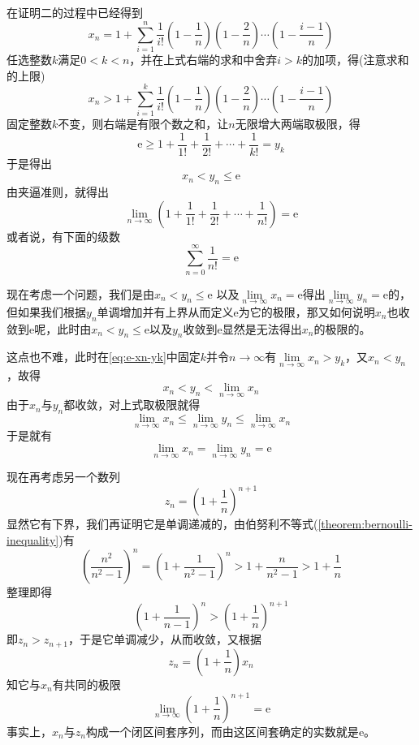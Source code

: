 在证明二的过程中已经得到
\[ x_n = 1 + \sum_{i=1}^n \frac{1}{i!}\left( 1-\frac{1}{n} \right) \left( 1-\frac{2}{n} \right) \cdots \left( 1-\frac{i-1}{n} \right) \]
任选整数$k$满足$0<k<n$，并在上式右端的求和中舍弃$i>k$的加项，得(注意求和的上限)
\begin{equation}\label{eq:e-xn-yk}
 x_n > 1 + \sum_{i=1}^k \frac{1}{i!}\left( 1-\frac{1}{n} \right) \left( 1-\frac{2}{n} \right) \cdots \left( 1-\frac{i-1}{n} \right) 
\end{equation}
固定整数$k$不变，则右端是有限个数之和，让$n$无限增大两端取极限，得
\[ \mathrm{e} \geqslant 1 + \frac{1}{1!} + \frac{1}{2!} + \cdots + \frac{1}{k!} = y_k \]
于是得出
\[ x_n < y_n \leqslant \mathrm{e} \]
由夹逼准则，就得出
\[ \lim_{n \to \infty} \left( 1 + \frac{1}{1!} + \frac{1}{2!} + \cdots + \frac{1}{n!} \right) = \mathrm{e} \]
或者说，有下面的级数
\begin{equation}
  \label{eq:series-1-devide-by-n-fractor-is-e}
 \sum_{n=0}^{\infty} \frac{1}{n!} = \mathrm{e} 
\end{equation}

现在考虑一个问题，我们是由$x_n<y_n \leqslant \mathrm{e}$ 以及$\lim\limits_{n \to \infty} x_n = \mathrm{e}$得出$\lim\limits_{n \to \infty} y_{n}=\mathrm{e}$的，但如果我们根据$y_n$单调增加并有上界从而定义$\mathrm{e}$为它的极限，那又如何说明$x_n$也收敛到$\mathrm{e}$呢，此时由$x_n<y_n\leqslant \mathrm{e}$以及$y_n$收敛到$\mathrm{e}$显然是无法得出$x_n$的极限的。

这点也不难，此时在\autoref{eq:e-xn-yk}中固定$k$并令$n\to\infty$有$\lim\limits_{n \to \infty} x_n > y_k$，又$x_n<y_n$，故得
\[ x_n < y_n < \lim_{n \to \infty} x_n \]
由于$x_n$与$y_n$都收敛，对上式取极限就得
\[ \lim_{n \to \infty} x_n \leqslant \lim_{n \to \infty}y_n \leqslant \lim_{n \to \infty} x_n \]
于是就有
\[ \lim_{n \to \infty} x_n = \lim_{n \to \infty} y_n = \mathrm{e} \]

现在再考虑另一个数列
\[ z_n = \left( 1 + \frac{1}{n} \right)^{n+1} \]
显然它有下界，我们再证明它是单调递减的，由伯努利不等式(\autoref{theorem:bernoulli-inequality})有
\[ \left( \frac{n^2}{n^2-1} \right)^n = \left( 1 + \frac{1}{n^2-1} \right)^n > 1 + \frac{n}{n^2-1} > 1 + \frac{1}{n} \]
整理即得
\[ \left( 1 + \frac{1}{n-1} \right)^n > \left( 1+ \frac{1}{n} \right)^{n+1} \]
即$z_n>z_{n+1}$，于是它单调减少，从而收敛，又根据
\[ z_n=\left( 1+\frac{1}{n} \right)x_n \]
知它与$x_n$有共同的极限
\[ \lim_{n \to \infty} \left( 1 + \frac{1}{n} \right)^{n+1} = \mathrm{e} \]
事实上，$x_n$与$z_n$构成一个闭区间套序列，而由这区间套确定的实数就是$\mathrm{e}$。

